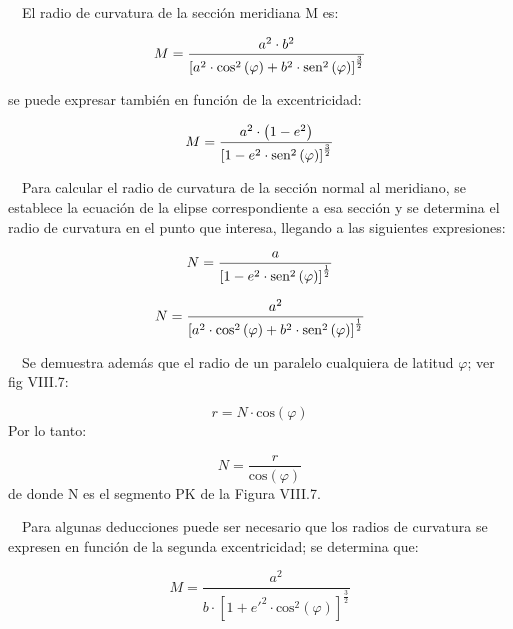 \documentclass{tufte-book}
\newcommand\normalsubformula[1]{\text{\mathversion{normal}$#1$}}
\begin{document}
\ \ El radio de curvatura de la sección meridiana M es:

\begin{equation*}
{M=\frac{a^{{2}}\cdot b^{{2}}}{\left[a^{{2}}\cdot \text{cos}^{{2}}\left(\varphi \right)+b^{{2}}\cdot \normalsubformula{\text{sen}}^{{2}}\left(\varphi \right)\right]^{{\frac{3}{2}}}}}
\end{equation*}

se puede expresar también en función de la excentricidad:

\begin{equation*}
{M=\frac{a^{{2}}\cdot \left(1-e^{{2}}\right)}{\left[1-e^{{2}}\cdot \normalsubformula{\text{sen}}^{{2}}\left(\varphi \right)\right]^{{\frac{3}{2}}}}}
\end{equation*}

\ \ Para calcular el radio de curvatura de la sección normal al
meridiano, se establece la ecuación de la elipse correspondiente a
esa sección y se determina el radio de curvatura en el punto que
interesa, llegando a las siguientes expresiones:

\begin{equation*}
{N=\frac{a}{\left[1-e^{{2}}\cdot \normalsubformula{\text{sen}}^{{2}}\left(\varphi \right)\right]^{{\frac{1}{2}}}}}
\end{equation*}

\begin{equation*}
{N=\frac{a^{{2}}}{\left[a^{{2}}\cdot \text{cos}^{{2}}\left(\varphi \right)+b^{{2}}\cdot \normalsubformula{\text{sen}}^{{2}}\left(\varphi \right)\right]^{{\frac{1}{2}}}}}
\end{equation*}

\ \ Se demuestra además que el radio de un paralelo cualquiera de
latitud  ${\varphi }$; ver fig VIII.7:

\begin{equation*}
{r=N\cdot \text{cos}\left(\varphi \right)}
\end{equation*}
Por lo tanto:

\begin{equation*}
{N=\frac{r}{\text{cos}\left(\varphi \right)}}
\end{equation*}
de donde N es el segmento PK de la Figura VIII.7.

\ \ Para algunas deducciones puede ser necesario que los radios de
curvatura se expresen en función de la segunda excentricidad; se
determina que:

\begin{equation*}
{M=\frac{a^{{2}}}{b\cdot \left[1+e'^{{2}}\cdot \text{cos}^{{2}}\left(\varphi \right)\right]^{{\frac{3}{2}}}}}
\end{equation*}
\end{document}

